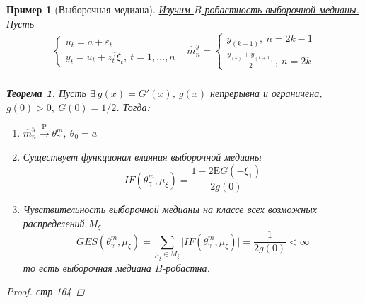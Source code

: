 \documentclass[12pt]{article}
\newtheorem*{example}{Пример}
\theoremstyle{basic_theorem}
\newtheorem{theorem}{Теорема}
\theoremstyle{name_theorem}
\def\eps{ \varepsilon }
\def\E{ \mathrm{E} }
\def\P{ \mathrm{P} }
\begin{document}
\begin{example}[Выборочная медиана]
        \underline{Изучим $B$-робастность выборочной медианы.}
        Пусть
        \[
        \begin{array}{cc}
        \begin{cases}
            u_t=a+\eps_t \\
            y_t=u_t+z_t^\gamma\xi_t,\ t=1,\ldots,n
        \end{cases} &
        \widehat{m}_n^y=
        \begin{cases}
            y_{(k+1)},\ n=2k-1 \\
            \frac{y_{(k)}+y_{(k+1)}}{2},\ n=2k
        \end{cases} \\
        \end{array}
        \]
        \begin{theorem}
            Пусть $\exists\ g(x)=G'(x)$, $g(x)$ непрерывна и ограничена,
            $g(0)>0,\ G(0)=1/2$. Тогда:
            \begin{enumerate}
                \item $\widehat{m}_n^y\xrightarrow{\P}\theta_\gamma^m,\ \theta_0=a$
                \item Существует функционал влияния выборочной медианы
                \[IF(\theta_\gamma^m,\mu_\xi)=\frac{1-2\E G(-\xi_1)}{2g(0)}\]
                \item Чувствительность выборочной медианы на классе всех возможных
                распределений $M_\xi$
                \[GES(\theta_\gamma^m,\mu_\xi)=\sum_{\mu_\xi\in M_\xi}\lvert IF(\theta_\gamma^m,\mu_\xi)\rvert=\frac{1}{2g(0)}<\infty\]
                то есть \underline{выборочная медиана $B$-робастна}.
            \end{enumerate}
        \end{theorem}
        \begin{proof}
            стр 164
        \end{proof}
    \end{example}

    
\end{document}

